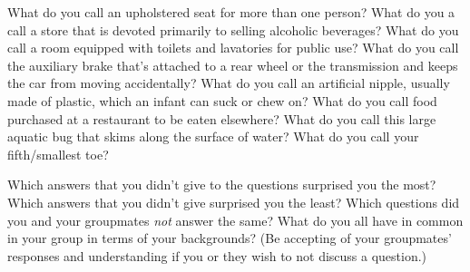 \documentclass[addpoints]{exam}
\begin{document}
\begin{questions}
    \question What do you call an upholstered seat for more than one person? \hrulefill
    \question What do you a call a store that is devoted primarily to selling alcoholic beverages? \hrulefill
    \question What do you call a room equipped with toilets and lavatories for public use? \hrulefill
    \question What do you call the auxiliary brake that's attached to a rear wheel or the transmission and keeps the car from moving accidentally? \hrulefill
    \question What do you call an artificial nipple, usually made of plastic, which an infant can suck or chew on? \hrulefill
    \question What do you call food purchased at a restaurant to be eaten elsewhere? \hrulefill
    \question What do you call this large aquatic bug that skims along the surface of water? \hrulefill
    \question What do you call your fifth/smallest toe? \hrulefill


    \question Which answers that you didn't give to the questions surprised you the most?
    \question Which answers that you didn't give surprised you the least?
    \question Which questions did you and your groupmates \emph{not} answer the same?
    \question What do you all have in common in your group in terms of your backgrounds? (Be accepting of your groupmates' responses and understanding if you or they wish to not discuss a question.)
\end{questions}
\end{document}
